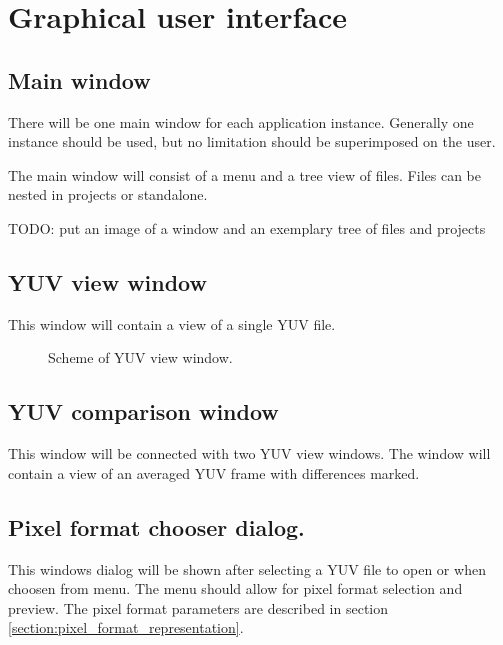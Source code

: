\chapter{Graphical user interface}
\label{chap:GUI}

\section{Main window}

There will be one main window for each application instance. Generally one instance should be used, but no limitation should be superimposed on the user.

The main window will consist of a menu and a tree view of files. Files can be nested in projects or standalone.

TODO: put an image of a window and an exemplary tree of files and projects

\section{YUV view window}

This window will contain a view of a single YUV file.

\begin{figure}[ht]
  \begin{center}
    \def\svgwidth{200pt}
    
    \caption{Scheme of YUV view window.\label{fig:YUV_view_window}}
  \end{center}
\end{figure}

\section{YUV comparison window}

This window will be connected with two YUV view windows. The window will contain a view of an averaged YUV frame with differences marked.

\section{Pixel format chooser dialog.}

This windows dialog will be shown after selecting a YUV file to open or when choosen from menu. The menu should allow for pixel format selection and preview. The pixel format parameters are described in section \ref{section:pixel_format_representation}.

